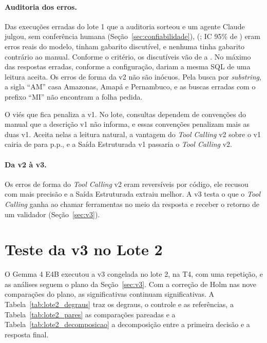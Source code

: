 \paragraph{Auditoria dos erros.} Das  execuções erradas do lote 1 que a auditoria sorteou e um agente Claude julgou, sem conferência humana (Seção~\ref{sec:confiabilidade}),  (; IC 95\% de ) eram erros reais do modelo,  tinham gabarito discutível, e nenhuma tinha gabarito contrário ao manual. Conforme o critério, os discutíveis vão de  a . No máximo  das respostas erradas, conforme a configuração, dariam a mesma SQL de uma leitura aceita. Os erros de forma da v2 não são inócuos. Pela busca por \textit{substring}, a sigla ``AM'' casa Amazonas, Amapá e Pernambuco, e as buscas erradas com o prefixo ``MI'' não encontram a folha pedida.

O viés que fica penaliza a v1. No lote,  consultas dependem de convenções do manual que a descrição v1 não informa, e essas convenções penalizam mais as duas v1. Aceita nelas a leitura natural, a vantagem do \textit{Tool Calling} v2 sobre o v1 cairia de  para  p.p., e a Saída Estruturada v1 passaria o \textit{Tool Calling} v2.

\paragraph{Da v2 à v3.} Os erros de forma do \textit{Tool Calling} v2 eram reversíveis por código, ele recusou com mais precisão e a Saída Estruturada extraiu melhor. A v3 testa o que o \textit{Tool Calling} ganha ao chamar ferramentas no meio da resposta e receber o retorno de um validador (Seção~\ref{sec:v3}).

\section{Teste da v3 no Lote 2}
\label{sec:v3-resultados}

O Gemma 4 E4B executou a v3 congelada no lote 2, na T4, com uma repetição, e as análises seguem o plano da Seção~\ref{sec:v3}. Com a correção de Holm nas nove comparações do plano, as significativas continuam significativas. A Tabela~\ref{tab:lote2_degraus} traz os degraus, o controle e as referências, a Tabela~\ref{tab:lote2_pares} as comparações pareadas e a Tabela~\ref{tab:lote2_decomposicao} a decomposição entre a primeira decisão e a resposta final.

